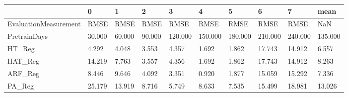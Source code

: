 \begin{tabular}{llllllllll}
\toprule
{} &      0 &      1 &      2 &       3 &       4 &       5 &       6 &       7 &    mean \\
\midrule
EvaluationMeasurement &   RMSE &   RMSE &   RMSE &    RMSE &    RMSE &    RMSE &    RMSE &    RMSE &     NaN \\
PretrainDays          & 30.000 & 60.000 & 90.000 & 120.000 & 150.000 & 180.000 & 210.000 & 240.000 & 135.000 \\
HT\_Reg                &  4.292 &  4.048 &  3.553 &   4.357 &   1.692 &   1.862 &  17.743 &  14.912 &   6.557 \\
HAT\_Reg               & 14.219 &  7.763 &  3.557 &   4.356 &   1.692 &   1.862 &  17.743 &  14.912 &   8.263 \\
ARF\_Reg               &  8.446 &  9.646 &  4.092 &   3.351 &   0.920 &   1.877 &  15.059 &  15.292 &   7.336 \\
PA\_Reg                & 25.179 & 13.919 &  8.716 &   5.749 &   8.633 &   7.535 &  15.499 &  18.981 &  13.026 \\
\bottomrule
\end{tabular}
